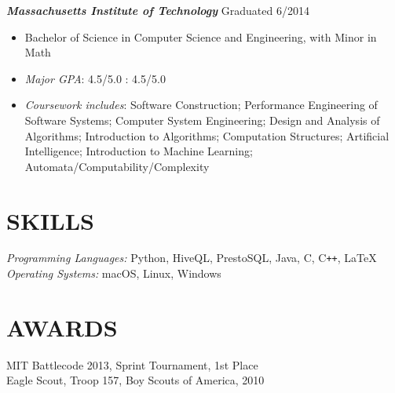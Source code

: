 \documentclass[margin]{res}
\begin{document}
\begin{resume}
                    {\sl \bf Massachusetts Institute of Technology} 
                    \hfill Graduated 6/2014
                    \begin{itemize} \itemsep -2pt %
                        \item Bachelor of Science in Computer Science
                        and Engineering, with Minor in Math
                        \item {\sl Major GPA}: 4.5/5.0  : 4.5/5.0 
                        \item {\sl Coursework includes}:
                          Software Construction;
                          Performance Engineering of Software Systems; 
                          Computer System Engineering; 
                          Design and Analysis of Algorithms; 
                          Introduction to Algorithms;
                          Computation Structures;
                          Artificial Intelligence; 
                          Introduction to Machine Learning; 
                          Automata/Computability/Complexity
                    \end{itemize}

\section{SKILLS}    {\sl Programming Languages:} Python, HiveQL, PrestoSQL, Java, C,
                      C\texttt{++}, \LaTeX \\
                    {\sl Operating Systems:} macOS, Linux, Windows
 
 
\section{AWARDS}    MIT Battlecode 2013, Sprint Tournament, 1st Place\\
                    Eagle Scout, Troop 157, Boy Scouts of America, 2010

\end{resume}
\end{document}
